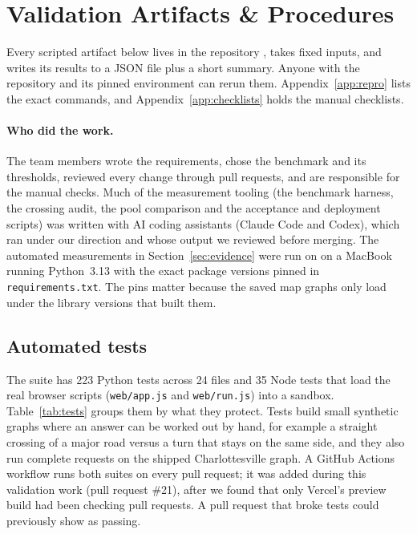 \section{Validation Artifacts \& Procedures}

Every scripted artifact below lives in the repository \citep{runline2026repo},
takes fixed inputs, and writes its results to a JSON file plus a short
summary. Anyone with the repository and its pinned environment can rerun
them. Appendix~\ref{app:repro} lists the exact commands, and
Appendix~\ref{app:checklists} holds the manual checklists.

\paragraph{Who did the work.}
The team members wrote the requirements, chose the benchmark and its
thresholds, reviewed every change through pull requests, and are responsible
for the manual checks. Much of the measurement tooling (the benchmark
harness, the crossing audit, the pool comparison and the acceptance and
deployment scripts) was written with AI coding assistants (Claude Code and
Codex), which ran under our direction and whose output we reviewed before
merging.  The automated measurements in
Section~\ref{sec:evidence} were run on  on a MacBook
running Python~3.13 with the exact package versions pinned in
\texttt{requirements.txt}. The pins matter because the saved map graphs only
load under the library versions that built them.

\subsection{Automated tests}
The suite has 223 Python tests across 24 files and 35 Node tests that load the
real browser scripts (\texttt{web/app.js} and \texttt{web/run.js}) into a
sandbox. Table~\ref{tab:tests} groups them by what they protect. Tests build
small synthetic graphs where an answer can be worked out by hand, for example
a straight crossing of a major road versus a turn that stays on the same
side, and they also run complete requests on the shipped Charlottesville
graph. A GitHub Actions workflow runs both suites on every pull request; it
was added during this validation work (pull request \#21), after we found
that only Vercel's preview build had been checking pull requests. A pull
request that broke tests could previously show as passing.

